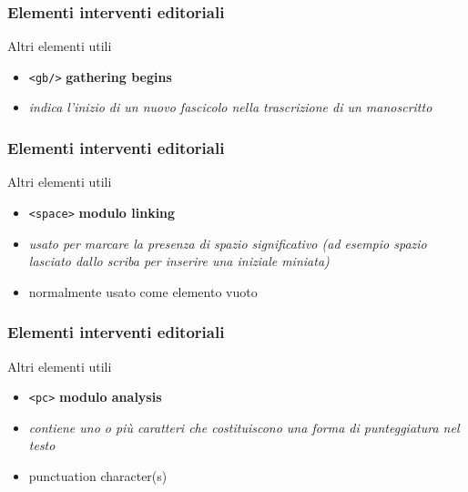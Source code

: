 
\begin{frame}
    \frametitle{Elementi interventi editoriali}
    \addtocounter{nframe}{1}
    
    \begin{block}{Altri elementi utili}
        \begin{itemize}
            \item \texttt{<gb/>} \textbf{gathering begins}
            \item[] \textit{indica l’inizio di un nuovo fascicolo nella trascrizione di un manoscritto}
        \end{itemize}
        
    \end{block}
    
\end{frame}

\begin{frame}
    \frametitle{Elementi interventi editoriali}
    \addtocounter{nframe}{1}
    
    \begin{block}{Altri elementi utili}
        \begin{itemize}
            \item \texttt{<space>} \textbf{modulo linking}
            \item[] \textit{usato per marcare la presenza di spazio significativo (ad esempio spazio lasciato dallo scriba per inserire una iniziale miniata)}
            \item[] normalmente usato come elemento vuoto
        \end{itemize}
        
    \end{block}
    
\end{frame}

\begin{frame}
    \frametitle{Elementi interventi editoriali}
    \addtocounter{nframe}{1}
    
    \begin{block}{Altri elementi utili}
        \begin{itemize}
            \item \texttt{<pc>} \textbf{modulo analysis}
            \item[] \textit{contiene uno o più caratteri che costituiscono una forma di punteggiatura nel testo}
            \item[] punctuation character(s)
        \end{itemize}
        
    \end{block}
    
\end{frame}


